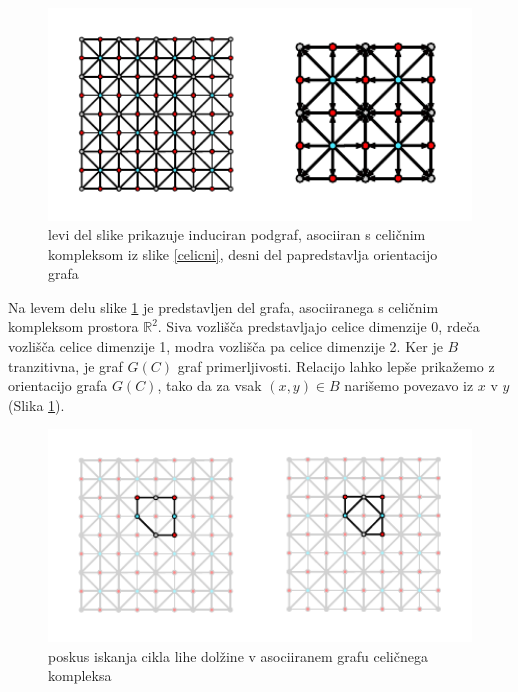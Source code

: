 \documentclass[a4paper, 12pt]{book}
\theoremstyle{definition}
\theoremstyle{remark}
\begin{document}
\begin{figure}[h]
  \begin{center}
    \includegraphics[width=1\textwidth]{r2-cell-graph.pdf}
    \end{center}
    \caption{levi del slike prikazuje induciran podgraf, asociiran s celičnim kompleksom
    iz slike \ref{celicni}, desni del papredstavlja orientacijo grafa}
    \label{celicni-graf}
\end{figure}
Na levem delu slike \ref{celicni-graf} je predstavljen del grafa, asociiranega s celičnim
kompleksom prostora $\mathbb{R}^2$. Siva vozlišča predstavljajo celice dimenzije 0, rdeča
vozlišča celice dimenzije 1, modra vozlišča pa celice dimenzije 2.
Ker je $B$ tranzitivna, je graf $G(C)$ graf primerljivosti. 
Relacijo lahko lepše prikažemo z orientacijo grafa $G(C)$, tako da za vsak
$(x,y) \in B$ narišemo povezavo iz $x$ v $y$ (Slika \ref{celicni-graf}).
\begin{figure}[h]
  \begin{center}
  \includegraphics[width=1\textwidth]{odd-circle-r2-cell.pdf}
  \end{center}
  \caption{poskus iskanja cikla lihe dolžine v asociiranem grafu celičnega kompleksa}
  \label{fail-celicni-graf}
\end{figure}
\end{document}
